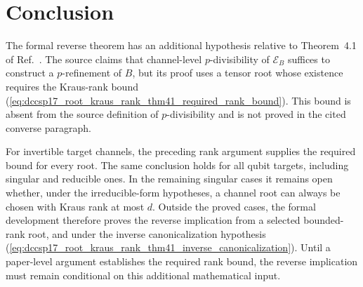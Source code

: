 \documentclass{article}
\begin{document}
\section{Conclusion}

The formal reverse theorem has an additional hypothesis relative to
Theorem~4.1 of Ref.~\cite{DeLasCuevas2017Irreducible}. The source claims that
channel-level $p$-divisibility of $\mathcal E_B$ suffices to construct a
$p$-refinement of $B$, but its proof uses a tensor root whose existence
requires the Kraus-rank bound
(\ref{eq:dccsp17_root_kraus_rank_thm41_required_rank_bound}). This bound is
absent from the source definition of $p$-divisibility and is not proved in the
cited converse paragraph.

For invertible target channels, the preceding rank argument supplies the
required bound for every root. The same conclusion holds for all qubit
targets, including singular and reducible ones. In the remaining singular cases it
remains open whether, under the irreducible-form hypotheses, a channel root
can always be chosen with Kraus rank at most $d$. Outside the proved cases,
the formal development
therefore proves the reverse implication from a selected bounded-rank
root, and under the inverse canonicalization hypothesis
(\ref{eq:dccsp17_root_kraus_rank_thm41_inverse_canonicalization}). Until a paper-level
argument establishes the required rank bound, the reverse implication must
remain conditional on this additional mathematical input.



\end{document}

